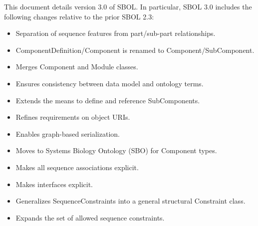 This document details version 3.0 of SBOL.  
In particular, SBOL 3.0 includes the following changes relative to the prior SBOL 2.3:
\begin{itemize}
\item Separation of sequence features from part/sub-part relationships.
\item ComponentDefinition/Component is renamed to Component/SubComponent.
\item Merges Component and Module classes.
\item Ensures consistency between data model and ontology terms.
\item Extends the means to define and reference SubComponents.
\item Refines requirements on object URIs.
\item Enables graph-based serialization.
\item Moves to Systems Biology Ontology (SBO) for Component types.
\item Makes all sequence associations explicit.
\item Makes interfaces explicit.
\item Generalizes SequenceConstraints into a general structural Constraint class.
\item Expands the set of allowed sequence constraints.
\end{itemize}

